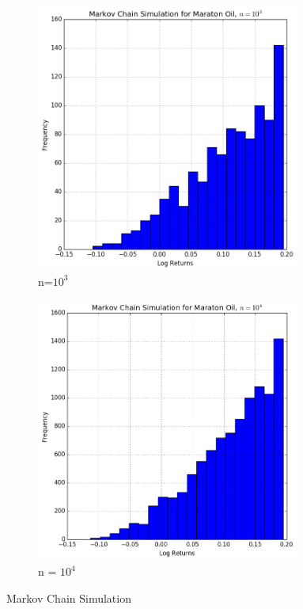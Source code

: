 \documentclass[a4paper,12pt]{article}
\theoremstyle{definition}
\begin{document}
\begin{figure}[h]
\centering
\begin{subfigure}{.5\textwidth}
  \centering
  \includegraphics[width=0.95\textwidth]{mcLogReturns_3.png} 
  \caption{n=$10^3$}
  \label{fig:MCSim3}
\end{subfigure}%
\begin{subfigure}{.5\textwidth}
  \centering
  \includegraphics[width=0.95\textwidth]{mcLogReturns_4.png} 
  \caption{ n = $10^4$}
  \label{fig:MCSim4}
\end{subfigure}
\caption{Markov Chain Simulation}
\label{fig:DiscreteMCSim1}
\end{figure}
\end{document}
